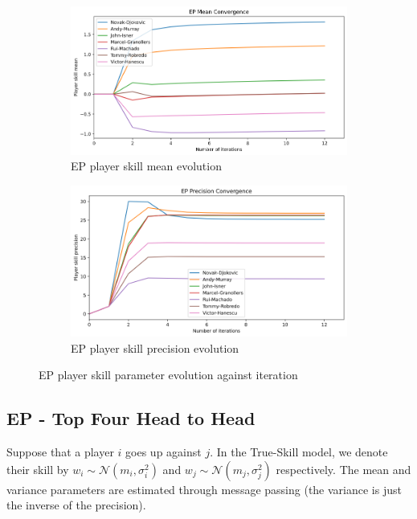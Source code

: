 \documentclass[]{article}
\newcommand{\Ncal}{\mathcal{N}}
\begin{document}
\begin{figure}[!h]
	\begin{subfigure}{0.5\linewidth}
		\centering
		\includegraphics[width=\linewidth]{ep-mean.png}
		\caption{EP player skill mean evolution}
		\label{fig:ep-mean}
	\end{subfigure}
	\begin{subfigure}{0.5\linewidth}
		\centering
		\includegraphics[width=\linewidth]{ep-precision.png}
		\caption{EP player skill precision evolution}
		\label{fig:ep-precision}
	\end{subfigure}
	\caption{EP player skill parameter evolution against iteration}
	\label{fig:ep-evolution}
\end{figure}


\subsection{EP - Top Four Head to Head}

Suppose that a player $i$ goes up against $j$. In the True-Skill model, we denote their skill by $w_i \sim \Ncal(m_i, \sigma_i^2)$ and $w_j \sim \Ncal(m_j, \sigma_j^2)$ respectively. The mean and variance parameters are estimated through message passing (the variance is just the inverse of the precision). 
\end{document}
